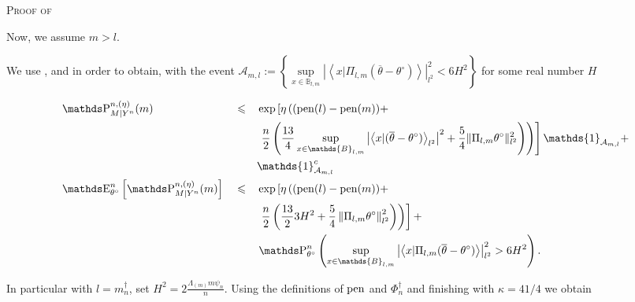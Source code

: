\begin{pro}{\textsc{Proof of } \\}

\medskip

Now, we assume $m > l$.

We use , and  in order to obtain, with the event $\mathcal{A}_{m, l} := \left\{ \sup\limits_{x \in \mathds{B}_{l, m}} \left\vert \left\langle x \vert \Pi_{l, m} (\overline{\theta} - \theta^{\circ}) \right\rangle \right\vert_{l^{2}}^{2} < 6H^{2} \right\}$ for some real number $H$

\begin{alignat*}{3}
& \P_{M \vert Y^{n}}^{n, (\eta)}(m) && \leq && \exp\left[\eta\left((\pen(l)-\pen(m)) +\right.\right.\notag\\
& && && \left.\left. \frac{n}{2} \left(\frac{13}{4}\sup\limits_{x \in \mathds{B}_{l, m}}\left\vert \left\langle x \vert  (\overline{\theta} - \theta^{\circ}) \right\rangle_{l^{2}} \right\vert^{2} + \frac{5}{4} \Vert \Pi_{l, m} \theta^{\circ} \Vert_{l^{2}}^{2} \right) \right)\right] \mathds{1}_{\mathcal{A}_{m, l}} +\notag\\
& && && \mathds{1}_{\mathcal{A}_{m, l}}^{c}\\
& \E_{\theta^{\circ}}^{n}\left[\P_{M \vert Y^{n}}^{n, (\eta)}(m)\right] && \leq &&  \exp \left[\eta\left((\pen(l)-\pen(m)) +\right.\right.\notag\\
& && && \left.\left. \frac{n}{2} \left( \frac{13}{2} 3H^{2} + \frac{5}{4} \left\Vert \Pi_{l, m} \theta^{\circ} \right\Vert_{l^{2}}^{2} \right) \right)\right] + \notag\\
& && && \P_{\theta^{\circ}}^{n}\left(\sup\limits_{x \in \mathds{B}_{l, m}} \left\vert \left\langle x \vert \Pi_{l, m} (\overline{\theta} - \theta^{\circ}) \right\rangle \right\vert_{l^{2}}^{2} > 6H^{2}\right).
\end{alignat*}

In particular with $l = m^{\dagger}_{n}$, set $H^{2} = 2 \frac{\Lambda_{(m)} m \psi_{n}}{n}$.
Using the definitions of $\operatorname{pen}$ and $\Phi^{\dagger}_{n}$ and finishing with $\kappa = 41/4$ we obtain


\end{pro}

